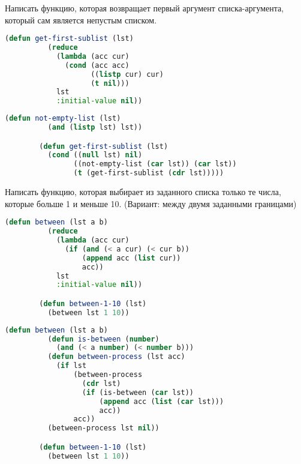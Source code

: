 \documentclass[a4paper,oneside,12pt]{extreport}
\begin{document}
\begin{task}
	Написать функцию, которая возвращает первый аргумент списка-аргумента, который сам является непустым списком.

	\begin{lstlisting}[language=Lisp, gobble=16]
		(defun get-first-sublist (lst)
		  (reduce
		    (lambda (acc cur)
		      (cond (acc acc)
		            ((listp cur) cur)
		            (t nil)))
		    lst
		    :initial-value nil))
	\end{lstlisting}

	\begin{lstlisting}[language=Lisp, gobble=16]
		(defun not-empty-list (lst)
		  (and (listp lst) lst))

		(defun get-first-sublist (lst)
		  (cond ((null lst) nil)
		        ((not-empty-list (car lst)) (car lst))
		        (t (get-first-sublist (cdr lst)))))
	\end{lstlisting}
\end{task}

\begin{task}
	Написать функцию, которая выбирает из заданного списка только те числа, которые больше 1 и меньше 10.
	(Вариант: между двумя заданными границами)

	\begin{lstlisting}[language=Lisp, gobble=16]
		(defun between (lst a b)
		  (reduce
		    (lambda (acc cur)
		      (if (and (< a cur) (< cur b))
		          (append acc (list cur))
		          acc))
		    lst
		    :initial-value nil))

		(defun between-1-10 (lst)
		  (between lst 1 10))
	\end{lstlisting}

	\begin{lstlisting}[language=Lisp, gobble=16]
		(defun between (lst a b)
		  (defun is-between (number)
		    (and (< a number) (< number b)))
		  (defun between-process (lst acc)
		    (if lst
		        (between-process
		          (cdr lst)
		          (if (is-between (car lst))
		              (append acc (list (car lst)))
		              acc))
		        acc))
		  (between-process lst nil))

		(defun between-1-10 (lst)
		  (between lst 1 10))
	\end{lstlisting}
\end{task}
\end{document}
